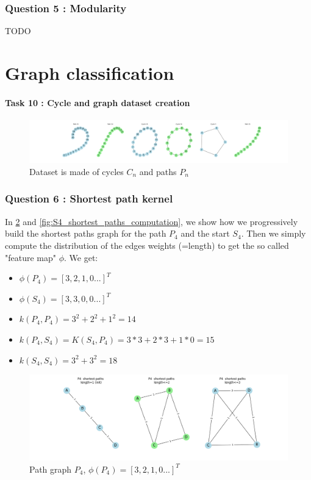 \documentclass[a4paper]{article}
\begin{document}
\section{Question 5 : Modularity}
TODO
\pagebreak
\part[short]{Graph classification}

\subsection*{Task 10 : Cycle and graph dataset creation}

\begin{figure}[ht]
        \centering
        \includegraphics[width=1.\textwidth]{figures/cycle_and_paths_dataset.png}
        \caption{Dataset is made of cycles $C_n$ and paths $P_n$}
        \label{fig:cycle_and_paths_dataset}
\end{figure}


\section{Question 6 : Shortest path kernel}
In \ref{fig:P4_shortest_paths_computation} and \ref{fig:S4_shortest_paths_computation}, we show 
how we progressively build the shortest paths graph for the path $P_4$ and the start $S_4$.
Then we simply compute the distribution of the edges weights (=length) to get the so called "feature map" $\phi$.
We get:
\begin{itemize}
    \item $\phi(P_4)=[3, 2, 1, 0 ...]^T$
    \item $\phi(S_4)=[3, 3, 0, 0 ...]^T$
    \item $k(P_4, P_4) = 3^2 + 2^2 + 1^2 = 14$
    \item $k(P_4, S_4) = K(S_4, P_4) = 3*3+2*3+1*0 = 15$
    \item $k(S_4, S_4) = 3^2 + 3^2 = 18$
\end{itemize}

\begin{figure}[ht]
        \centering
        \includegraphics[width=1.\textwidth]{figures/P4_shortest_paths_computation.png}
        \caption{Path graph $P_4$, $\phi(P_4)=[3, 2, 1, 0 ...]^T$}
        \label{fig:P4_shortest_paths_computation}
\end{figure}
\end{document}
